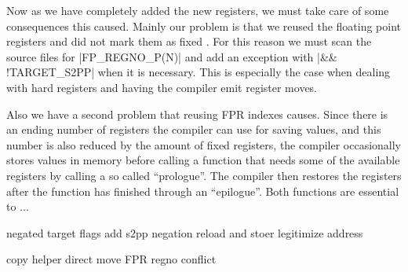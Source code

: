 Now as we have completely added the new registers, we must take care of some consequences this caused.
Mainly our problem is that we reused the floating point registers and did not mark them as fixed .
For this reason we must scan the source files for |FP_REGNO_P(N)| and add an exception with |&& !TARGET_S2PP| when it is necessary.
This is especially the case when dealing with hard registers and having the compiler emit register moves.

Also we have a second problem that reusing FPR indexes causes.
Since there is an ending number of registers the compiler can use for saving values, and this number is also reduced by the amount of fixed registers, the compiler occasionally stores values in memory before calling a function that needs some of the available registers by calling a so called ``prologue''.
The compiler then restores the registers after the function has finished through an ``epilogue''.
Both functions are essential to ...


negated target flags add s2pp negation
reload and stoer
legitimize address


copy helper direct move
FPR regno conflict


